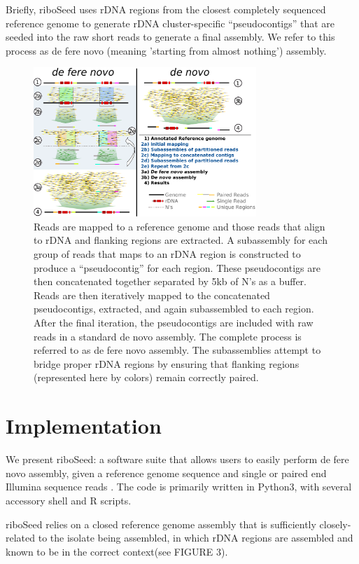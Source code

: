 \documentclass[11pt]{article}
\begin{document}
\begin{linenumbers}
Briefly, riboSeed uses rDNA regions from the closest completely sequenced reference genome to generate rDNA cluster-specific “pseudocontigs” that are seeded into the raw short reads to generate a final assembly. We refer to this process as de fere novo (meaning 'starting from almost nothing') assembly.


\begin{figure}[h]
    \centering
    \includegraphics[width=0.75\textwidth]{riboSeed_v11}
    \caption{Reads are mapped to a reference genome and those reads that align to rDNA and flanking regions are extracted. A subassembly for each group of reads that maps to an rDNA region is constructed to produce a “pseudocontig” for each region. These pseudocontigs are then concatenated together separated by 5kb of N’s as a buffer. Reads are then iteratively mapped to the concatenated pseudocontigs, extracted, and again subassembled to each region. After the final iteration, the pseudocontigs are included with raw reads in a standard de novo assembly. The complete process is referred to as de fere novo assembly. The subassemblies attempt to bridge proper rDNA regions by ensuring that flanking regions (represented here by colors) remain correctly paired.
}
    \label{fig:overview}
\end{figure}




\section*{Implementation}
We present riboSeed: a software suite that allows users to easily perform de fere novo assembly, given a reference genome sequence and single or paired end Illumina sequence reads . The code is primarily written in Python3, with several accessory shell and R scripts.


riboSeed relies on a closed reference genome assembly that is sufficiently closely-related to the isolate being assembled, in which rDNA regions are assembled and known to be in the correct context(see FIGURE 3).


\end{linenumbers}
\end{document}
